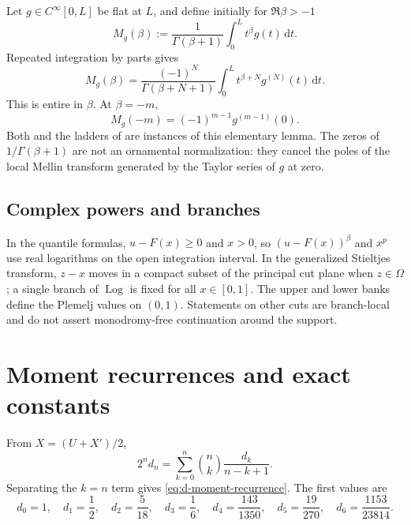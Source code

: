 \documentclass[11pt,oneside]{article}
\theoremstyle{definition}
\theoremstyle{remark}
\newcommand{\Log}{\operatorname{Log}}
\newcommand{\dd}{\,\mathrm d}
\begin{document}
Let $g\in C^\infty[0,L]$ be flat at $L$, and define initially for
$\Re\beta>-1$
\begin{equation}
 M_g(\beta):=\frac1{\Gamma(\beta+1)}\int_0^L t^\beta g(t)\dd t.
\end{equation}
Repeated integration by parts gives
\begin{equation}
 M_g(\beta)
 =\frac{(-1)^N}{\Gamma(\beta+N+1)}
  \int_0^L t^{\beta+N}g^{(N)}(t)\dd t.
 \label{eq:generic-entire-Mellin}
\end{equation}
This is entire in $\beta$.  At $\beta=-m$,
\begin{equation}
 M_g(-m)=(-1)^{m-1}g^{(m-1)}(0).
 \label{eq:generic-negative-value}
\end{equation}
Both  and the ladders of  are
instances of this elementary lemma.  The zeros of $1/\Gamma(\beta+1)$ are
not an ornamental normalization: they cancel the poles of the local Mellin
transform generated by the Taylor series of $g$ at zero.

\subsection{Complex powers and branches}

In the quantile formulas, $u-F(x)\ge0$ and $x>0$, so
$(u-F(x))^\beta$ and $x^p$ use real logarithms on the open integration
interval.  In the generalized Stieltjes transform, $z-x$ moves in a compact
subset of the principal cut plane when $z\in\Omega$; a single branch of
$\Log$ is fixed for all $x\in[0,1]$.  The upper and lower banks define the
Plemelj values on $(0,1)$.  Statements on other cuts are branch-local and do
not assert monodromy-free continuation around the support.

\section{Moment recurrences and exact constants}
\label{app:moments}

From $X=(U+X')/2$,
\begin{equation}
 2^nd_n=\sum_{k=0}^n\binom nk\frac{d_k}{n-k+1}.
\end{equation}
Separating the $k=n$ term gives \eqref{eq:d-moment-recurrence}.  The first
values are
\begin{equation}
 d_0=1,
 \quad d_1=\frac12,
 \quad d_2=\frac5{18},
 \quad d_3=\frac16,
 \quad d_4=\frac{143}{1350},
 \quad d_5=\frac{19}{270},
 \quad d_6=\frac{1153}{23814}.
\end{equation}
\end{document}
